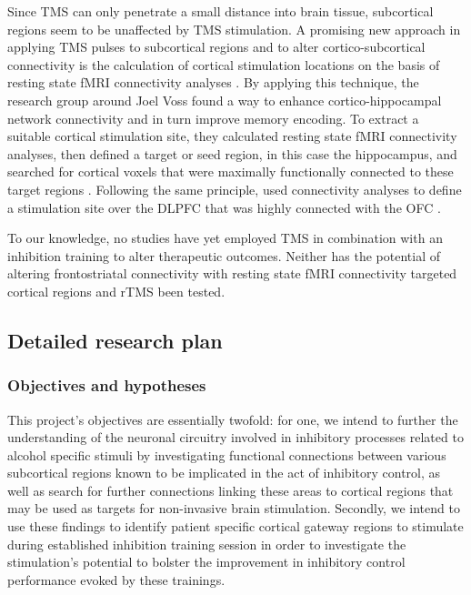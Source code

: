 \documentclass[12pt]{article}
\begin{document}
Since TMS can only penetrate a small distance into brain tissue, subcortical regions seem to be unaffected by TMS stimulation. A promising new approach in applying TMS pulses to subcortical regions and to alter cortico-subcortical connectivity is the calculation of cortical stimulation locations on the basis of resting state fMRI connectivity analyses \parencite{wangTargetedEnhancementCorticalhippocampal2014}. By applying this technique, the research group around Joel Voss found a way to enhance cortico-hippocampal network connectivity and in turn improve memory encoding. To extract a suitable cortical stimulation site, they calculated resting state fMRI connectivity analyses, then defined a target or seed region, in this case the hippocampus, and searched for cortical voxels that were maximally functionally connected to these target regions \parencite{hermillerEvidenceImmediateEnhancement2020}. Following the same principle, \textcite{howardTargetedStimulationHuman2020} used connectivity analyses to define a stimulation site over the DLPFC that was highly connected with the OFC \parencite{howardTargetedStimulationHuman2020}. 

To our knowledge, no studies have yet employed TMS in combination with an inhibition training to alter therapeutic outcomes. Neither has the potential of altering frontostriatal connectivity with resting state fMRI connectivity targeted cortical regions and rTMS been tested.

\subsection{Detailed research plan}


\subsubsection{Objectives and hypotheses}

This project's objectives are essentially twofold: for one, we intend to further the understanding of the neuronal circuitry involved in inhibitory processes related to alcohol specific stimuli by investigating functional connections between various subcortical regions known to be implicated in the act of inhibitory control, as well as search for further connections linking these areas to cortical regions that may be used as targets for non-invasive brain stimulation. Secondly, we intend to use these findings to identify patient specific cortical gateway regions to stimulate during established inhibition training session in order to investigate the stimulation's potential to bolster the improvement in inhibitory control performance evoked by these trainings.
\end{document}
